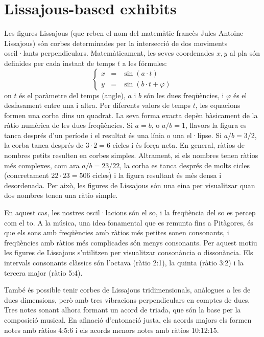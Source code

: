 \section{Lissajous-based exhibits}

Les figures Lissajous (que reben el nom del matemàtic francès Jules Antoine Lissajous) són corbes determinades per la intersecció de dos moviments oscil·lants perpendiculars. Matemàticament, les seves coordenades $x,y$ al pla són definides per cada instant de temps $t$ a les fórmules:
$$\left\{ \begin{array}{rcl}
x &=& \sin(a\cdot t) \\
y &=& \sin(b\cdot t + \varphi)
\end{array} \right. $$
on $t$ és el paràmetre del temps (angle), $a$ i $b$ són les dues freqüències, i $\varphi$ és el desfasament entre una i altra. Per diferents valors de temps $t$, les equacions formen una corba dins un quadrat. La seva forma exacta depèn bàsicament de la ràtio numèrica de les dues freqüències. Si $a=b$, o $a/b=1$, llavors la figura es tanca després d'un període i el resultat és una línia o una el·lipse. Si $a/b = 3/2$, la corba tanca després de $3\cdot 2=6$ cicles i és força neta. En general, ràtios de nombres petits resulten en corbes simples. Altrament, si els nombres	tenen ràtios més complexes, com ara $a/b = 23/22$, la corba es tanca després de molts cicles (concretament $22\cdot 23=506$ cicles) i la figura resultant és més densa i desordenada. Per això, les figures de Lissajous són una eina per visualitzar quan dos nombres tenen una ràtio simple.

En aquest cas, les nostres oscil·lacions són el so, i la freqüència del so es percep com el to. A la música, una idea fonamental que es remunta fins a Pitàgores, és que els sons amb freqüències amb ràtios més petites sonen consonants, i freqüències amb ràtios més complicades són menys consonants. Per aquest motiu les figures de Lissajous s'utilitzen per visualitzar consonància o dissonància. Els intervals consonants clàssics són l'octava (ràtio 2:1), la quinta (ràtio 3:2) i la tercera major (ràtio 5:4).

També és possible tenir corbes de Lissajous tridimensionals, anàlogues a les de dues dimensions, però amb tres vibracions perpendiculars en comptes de dues. Tres notes sonant alhora formant un acord de triada, que són la base per la composició musical. En afinació d'entonació justa, els acords majors els formen notes amb ràtios 4:5:6 i els acords menors notes amb ràtios 10:12:15.

